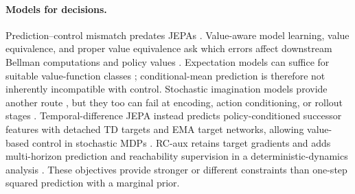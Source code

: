 \paragraph{Models for decisions.}
Prediction--control mismatch predates JEPAs \citep{lambert2020objective}. Value-aware model learning,
value equivalence, and proper value equivalence ask which errors affect downstream Bellman
computations and policy values \citep{farahmand2017vaml,grimm2020value,grimm2021proper}.
Expectation models can suffice for suitable value-function classes \citep{wan2019expectation};
conditional-mean prediction is therefore not inherently incompatible with control. Stochastic
imagination models provide another route \citep{hafner2020dreamer,alonso2024diamond,hafner2025dreamer4},
but they too can fail at encoding, action conditioning, or rollout stages
\citep{hansen2026hallucination}. Temporal-difference JEPA instead predicts policy-conditioned successor features with detached TD
targets and EMA target networks, allowing value-based control in stochastic MDPs
\citep{bagatella2026tdjepa}. RC-aux retains target gradients and adds multi-horizon prediction and
reachability supervision in a deterministic-dynamics analysis \citep{li2026rcaux}. These objectives
provide stronger or different constraints than one-step squared prediction with a marginal prior.
